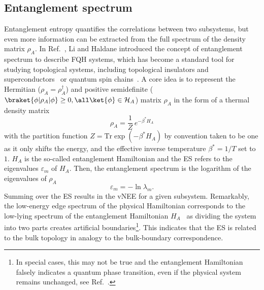 \subsection{Entanglement spectrum}
Entanglement entropy quantifies the correlations between two subsystems, but even more information can be extracted from the full spectrum of the density matrix $\rho_A$. In Ref.~\cite{PhysRevLett.101.010504}, Li and Haldane introduced the concept of entanglement spectrum to describe FQH systems, which has become a standard tool for studying topological systems, including topological insulators and superconductors~\cite{Fid:ES} or quantum spin chains~\cite{PhysRevLett.109.237208}. A core idea is to represent the Hermitian ($\rho_A = \rho_A^{\dagger}$) and positive semidefinite ($\braket{\phi | \rho_A| \phi} \geq 0, \all \ket{\phi} \in \mathcal{H}_A$) matrix $\rho_A$ in the form of a thermal density matrix
\begin{equation}
\rho_A = \frac{1}{Z} \, e^{- \beta^* H_A}
\label{eq:ent_spec}
\end{equation}
with the partition function $Z = \mathrm{Tr} \exp (-\beta^* H_{A})$ by convention taken to be one as it only shifts the energy, and the effective inverse temperature $\beta^* = 1/T$ set to $1$. $H_A$ is the so-called entanglement Hamiltonian and the ES refers to the eigenvalues $\varepsilon_m$ of $H_A$. Then, the entanglement spectrum is the logarithm of the eigenvalues of $\rho_A$
\begin{equation}
\varepsilon_m = - \ln \lambda_m.
\label{eq:loges}
\end{equation}
Summing over the ES results in the vNEE for a given subsystem. Remarkably, the low-energy edge spectrum of the physical Hamiltonian corresponds to the low-lying spectrum of the entanglement Hamiltonian $H_A$~\cite{PhysRevLett.101.010504, PhysRevB.84.205136} as dividing the system into two parts creates artificial boundaries\footnote{In special cases, this may not be true and the entanglement Hamiltonian falsely indicates a quantum phase transition, even if the physical system remains unchanged, see Ref.~\cite{Sondhi:univ}.}. This indicates that the ES is related to the bulk topology in analogy to the bulk-boundary correspondence.

